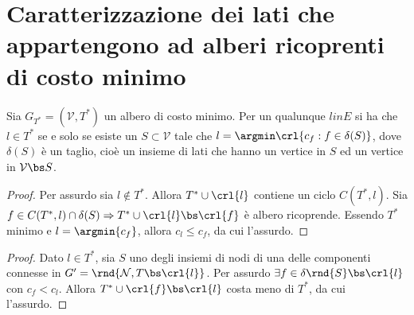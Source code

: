 \documentclass[\main/main.tex]{subfiles}
\begin{document}
\section{Caratterizzazione dei lati che appartengono ad alberi ricoprenti di costo minimo}
\begin{theorem}
  Sia $G_{T^*} = (\mathcal{V}, T^*)$ un albero di costo minimo. Per un qualunque $l in E$ si ha che $l \in T^*$ se e solo se esiste un $S \subset \mathcal{V}$ tale che $l = \argmin\crl{c_f: f \in \delta(S)}$, dove $\delta(S)$ è un taglio, cioè un insieme di lati che hanno un vertice in $S$ ed un vertice in $\mathcal{V} \bs S$.
\end{theorem}

\begin{proof}
  Per assurdo sia $l \not\in T^*$. Allora $T^* \cup \crl{l}$ contiene un ciclo $C(T^*, l)$. Sia $f \in C(T^*, l) \cap \delta(S) \Rightarrow T^* \cup \crl{l} \bs \crl{f}$ è albero ricoprende. Essendo $T^*$ minimo e $l = \argmin{c_f}$, allora $c_l \leq c_f$, da cui l'assurdo.
\end{proof}

\begin{proof}
  Dato $l \in T^*$, sia $S$ uno degli insiemi di nodi di una delle componenti connesse in $G' = \rnd{\mathcal{N}, T \bs \crl{l}}$. Per assurdo $\exists f \in \delta\rnd{S}\bs \crl{l}$ con $c_f < c_l$. Allora $T^*\cup \crl{f} \bs \crl{l}$ costa meno di $T^*$, da cui l'assurdo.
\end{proof}
\end{document}
